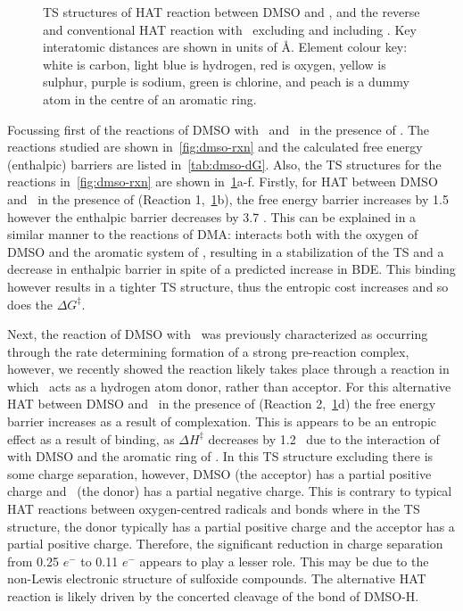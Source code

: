 \begin{figure}[!htbp]
  \caption[TS structures of HAT reaction between DMSO and \cumo, and the
  reverse and conventional HAT reaction with \bno\ excluding and including
  .]{TS structures of HAT reaction between DMSO and \cumo, and the
  reverse and conventional HAT reaction with \bno\ excluding and including
  . Key interatomic distances are shown in units of \AA. Element
  colour key: white is carbon, light blue is hydrogen, red is oxygen, yellow is
  sulphur, purple is sodium, green is chlorine, and peach is a dummy atom in
  the centre of an aromatic ring.} \label{fig:dmso-ts}
\end{figure}

Focussing first of the reactions of DMSO with \cumo\ and \bno\ in the presence
of . The reactions studied are shown in~\ref{fig:dmso-rxn} and the
calculated free energy (enthalpic) barriers are listed in~\ref{tab:dmso-dG}.
Also, the TS structures for the reactions in~\ref{fig:dmso-rxn} are shown
in~\ref{fig:dmso-ts}a-f. Firstly, for HAT between DMSO and \cumo\ in the
presence of  (Reaction 1,~\ref{fig:dmso-ts}b), the free energy barrier
increases by 1.5 \kcalmol\, however the enthalpic barrier decreases by 3.7
\kcalmol. This can be explained in a similar manner to the reactions of DMA:
 interacts both with the oxygen of DMSO and the aromatic system of
\cumo, resulting in a stabilization of the TS and a decrease in enthalpic
barrier in spite of a predicted increase in  BDE. This binding however
results in a tighter TS structure, thus the entropic cost increases and so does
the $\Delta G^\ddagger$.

Next, the reaction of DMSO with \bno\ was previously
characterized\cite{Salamone2012} as occurring through the rate determining
formation of a strong pre-reaction complex, however, we recently showed the
reaction likely takes place through a reaction in which \bno\ acts as a
hydrogen atom donor, rather than acceptor.\cite{vanSanten2016} For this
alternative HAT between DMSO and \bno\ in the presence of  (Reaction
2,~\ref{fig:dmso-ts}d) the free energy barrier increases as a result of
complexation. This is appears to be an entropic effect as a result of binding,
as $\Delta H^\ddagger$ decreases by 1.2 \kcalmol\ due to the interaction of
 with DMSO and the aromatic ring of \bno. In this TS structure
excluding  there is some charge separation, however, DMSO (the
acceptor) has a partial positive charge and \bno\ (the donor) has a partial
negative charge. This is contrary to typical HAT reactions between
oxygen-centred radicals and  bonds where in the TS structure, the donor
typically has a partial positive charge and the acceptor has a partial positive
charge. Therefore, the significant reduction in charge separation from 0.25
$e^-$ to 0.11 $e^-$ appears to play a lesser role. This may be due to the
non-Lewis electronic structure of sulfoxide compounds. The alternative HAT
reaction is likely driven by the concerted cleavage of the  bond of
DMSO-H.

